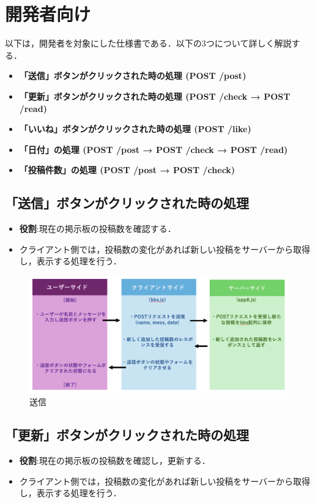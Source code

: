 \documentclass[uplatex,dvipdfmx]{jsarticle}
\begin{document}
\section{開発者向け}
以下は，開発者を対象にした仕様書である．以下の3つについて詳しく解説する．
\begin{itemize}
    \item \textbf{「送信」ボタンがクリックされた時の処理 (POST /post)}
    \item \textbf{「更新」ボタンがクリックされた時の処理 (POST /check → POST /read)}
    \item \textbf{「いいね」ボタンがクリックされた時の処理 (POST /like)}
    \item \textbf{「日付」の処理 (POST /post → POST /check → POST /read)}
    \item \textbf{「投稿件数」の処理 (POST /post → POST /check)}
\end{itemize}

\subsection{「送信」ボタンがクリックされた時の処理}
\begin{itemize}
    \item \textbf{役割}:現在の掲示板の投稿数を確認する．
    \item クライアント側では，投稿数の変化があれば新しい投稿をサーバーから取得し，表示する処理を行う．
\end{itemize}

\begin{figure}[h]
    \centering
    \includegraphics[width=14cm]{送信.png}
    \caption{送信}
    \label{fig:送信}
\end{figure}

\clearpage
\subsection{「更新」ボタンがクリックされた時の処理}
\begin{itemize}
    \item \textbf{役割}:現在の掲示板の投稿数を確認し，更新する．
    \item クライアント側では，投稿数の変化があれば新しい投稿をサーバーから取得し，表示する処理を行う．
\end{itemize}
\end{document}
